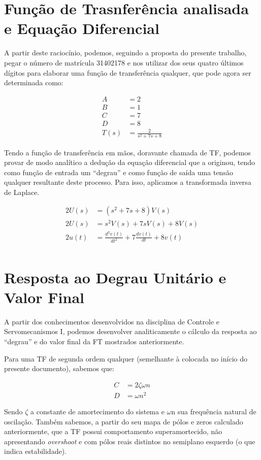 \documentclass[
	article,			%
	11pt,				%
	oneside,			%
	a4paper,			%
	english,			%
	brazil,				%
	sumario=tradicional
	]{abntex2}
\begin{document}
\section{Função de Trasnferência analisada e Equação Diferencial}

A partir deste raciocínio, podemos, seguindo a proposta do presente trabalho, pegar o número
de matrícula 31402178 e nos utilizar dos seus quatro últimos dígitos para elaborar uma
função de transferência qualquer, que pode agora ser determinada como:

\begin{align*}
  A &= 2 \\
  B &= 1 \\
  C &= 7 \\
  D &= 8 \\
  T(s) &= \frac{2}{s^2 + 7 s + 8}
\end{align*}

Tendo a função de transferência em mãos, doravante chamada de TF, podemos provar
de modo analítico a dedução da equação diferencial que a originou, tendo como
função de entrada um ``degrau'' e como função de saída uma tensão qualquer resultante
deste processo. Para isso, aplicamos a transformada inversa de Laplace.

\begin{align*}
  2U(s) &= (s^2 + 7s + 8)V(s) \\
  2U(s) &= s^2 V(s) + 7sV(s) + 8V(s) \\
  2u(t) &= \frac{d^2 v(t)}{dt^2} + 7\frac{d v(t)}{dt} + 8v(t) \\
\end{align*}

\section{Resposta ao Degrau Unitário e Valor Final}

A partir dos conhecimentos desenvolvidos na disciplina de Controle e Servomecanismos I, podemos desenvolver analiticamente
o cálculo da resposta ao ``degrau'' e do valor final da FT mostrados anteriormente.

Para uma TF de segunda ordem qualquer (semelhante à colocada no início do presente documento), sabemos que:

\begin{align*}
  C &= 2\zeta\omega n \\
  D &= \omega n^2
\end{align*}

Sendo ${\zeta}$ a constante de amortecimento do sistema e ${\omega}$n sua frequência natural de oscilação. Também sabemos, a partir do seu mapa de pólos e zeros calculado anteriormente, que a TF possui comportamento superamortecido, não apresentando \emph{overshoot} e com pólos reais distintos no semiplano esquerdo (o que indica estabilidade).
\end{document}
